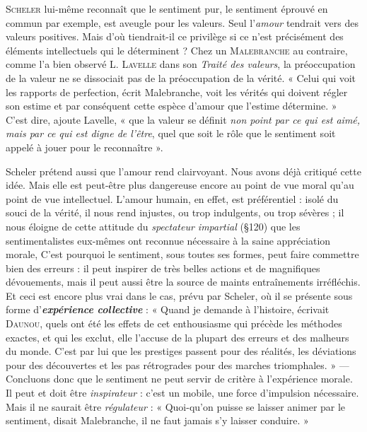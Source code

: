 \textsc{Scheler} lui-même reconnaît que le sentiment pur, le sentiment
éprouvé en commun par exemple, est aveugle pour les valeurs. Seul
l'{\it amour} tendrait vers des valeurs positives. Mais d’où tiendrait-il
ce privilège si ce n’est précisément des éléments intellectuels qui le
déterminent ? Chez un \textsc{Malebranche} au contraire, comme l’a bien
observé L. \textsc{Lavelle} dans son {\it Traité des valeurs}, la préoccupation
de la valeur ne se dissociait pas de la préoccupation de la vérité.
« Celui qui voit les rapports de perfection, écrit Malebranche, voit
les vérités qui doivent régler son estime et par conséquent cette espèce
d'amour que l'estime détermine. » C’est dire, ajoute Lavelle, « que la
valeur se définit {\it non point par ce qui est aimé, mais par ce qui est
digne de l'être}, quel que soit le rôle que le sentiment soit appelé à
jouer pour le reconnaître ».

Scheler prétend aussi que l’amour rend clairvoyant. Nous avons
déjà critiqué cette idée. Mais elle est peut-être plus dangereuse encore
au point de vue moral qu’au point de vue intellectuel. L'amour
humain, en effet, est préférentiel : isolé du souci de la vérité, il nous rend
injustes, ou trop indulgents, ou trop sévères ; il nous éloigne de cette
attitude du {\it spectateur impartial} (\S 120) que les sentimentalistes eux-mêmes
ont reconnue nécessaire à la saine appréciation morale, C’est
pourquoi le sentiment, sous toutes ses formes, peut faire commettre
bien des erreurs : il peut inspirer de très belles actions et de magnifiques
dévouements, mais il peut aussi être la source de maints entraînements
irréfléchis. Et ceci est encore plus vrai dans le cas, prévu par
Scheler, où il se présente sous forme d’\textbf{\textit {expérience collective}} : « Quand
je demande à l’histoire, écrivait \textsc{Daunou}, quels ont été les effets de cet
enthousiasme qui précède les méthodes exactes, et qui les exclut,
elle l’accuse de la plupart des erreurs et des malheurs du monde. C’est
par lui que les prestiges passent pour des réalités, les déviations pour
des découvertes et les pas rétrogrades pour des marches triomphales. »
— Concluons donc que le sentiment ne peut servir de critère à l’expérience
morale. Il peut et doit être {\it inspirateur} : c’est un mobile, une
force d’impulsion nécessaire. Mais il ne saurait être {\it régulateur} : « Quoi-qu’on
puisse se laisser animer par le sentiment, disait Malebranche,
il ne faut jamais s’y laisser conduire. »

